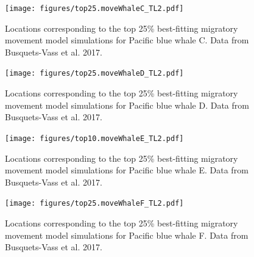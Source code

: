 \documentclass[a4paper,10pt]{article}
\begin{document}
\begin{landscape}
    \begin{figure}[!htbp]
    \centering
      \texttt{[image: figures/top25.moveWhaleC\_TL2.pdf]}
      \caption{Locations corresponding to the top 25\% best-fitting migratory movement model simulations for Pacific blue whale C. Data from Busquets-Vass et al. 2017.}
      \label{figwhaleC}
  \end{figure}
\end{landscape}

\begin{landscape}
    \begin{figure}[!htbp]
    \centering
      \texttt{[image: figures/top25.moveWhaleD\_TL2.pdf]}
      \caption{Locations corresponding to the top 25\% best-fitting migratory movement model simulations for Pacific blue whale D. Data from Busquets-Vass et al. 2017.}
      \label{figwhaleD}
  \end{figure}
\end{landscape}

\begin{landscape}
    \begin{figure}[!htbp]
    \centering
      \texttt{[image: figures/top10.moveWhaleE\_TL2.pdf]}
      \caption{Locations corresponding to the top 25\% best-fitting migratory movement model simulations for Pacific blue whale E. Data from Busquets-Vass et al. 2017.}
      \label{figwhaleE}
  \end{figure}
\end{landscape}

\begin{landscape}
    \begin{figure}[!htbp]
    \centering
      \texttt{[image: figures/top25.moveWhaleF\_TL2.pdf]}
      \caption{Locations corresponding to the top 25\% best-fitting migratory movement model simulations for Pacific blue whale F. Data from Busquets-Vass et al. 2017.}
      \label{figwhaleF}
  \end{figure}
\end{landscape}

 
\newpage


\end{document}
